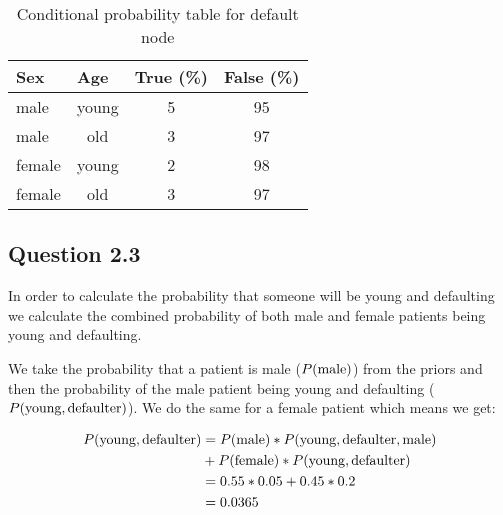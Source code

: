 \documentclass[12pt,notitlepage]{article}
\begin{document}
\begin{table*}[h]
\centering
\caption{Conditional probability table for default node}
\label{my-label}
\begin{tabular}{lc|cc}
\hline
\textbf{Sex} & \multicolumn{1}{l}{\textbf{Age}} &
    \multicolumn{1}{l}{\textbf{True (\%)}} & \multicolumn{1}{l}{\textbf{False
    (\%)}} \\ \hline
male         & young                            & 5                                 & 95                                 \\ \hline
male         & old                              & 3                                 & 97                                 \\ \hline
female       & young                            & 2                                 & 98                                 \\ \hline
female       & old                              & 3                                 & 97                                 \\ \hline
\end{tabular}
\end{table*}



\subsection*{Question 2.3}

In order to calculate the probability that someone will be young and defaulting
we calculate the combined probability of both male and female patients being
young and defaulting.

We take the probability that a patient is male
($P(\textnormal{male})$) from the priors and then the probability
of the male patient being young and defaulting
($P(\textnormal{young},
\textnormal{defaulter})$). We do the same for a female patient
which means we get:

\begin{align*}
    P(\textnormal{young},\textnormal{defaulter}) &= 
    P(\textnormal{male})*P(\textnormal{young}, \textnormal{defaulter},
    \textnormal{male}) \\ 
    & + P(\textnormal{female})*P(\textnormal{young},\textnormal{defaulter}) \\
    &= 0.55*0.05 + 0.45*0.2 \\
    &= 0.0365
\end{align*}
\end{document}
